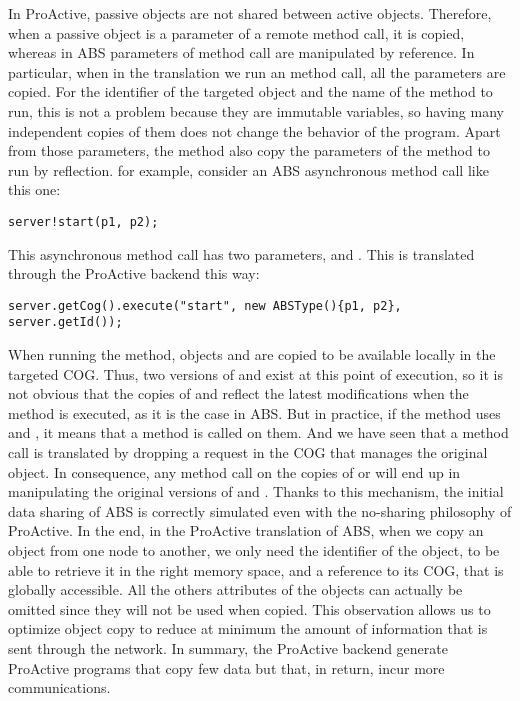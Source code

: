In ProActive, passive objects are not shared between active objects. Therefore, when a passive object is a parameter of a remote method call, it is copied, whereas in ABS parameters of method call are manipulated by reference.
In particular, when in the translation we run an  method call, all the parameters are copied. For the identifier of the targeted object and the name of the method to run, this is not a problem because they are immutable variables, so having many independent copies of them does not change the behavior of the program. Apart from those parameters, the  method also copy the parameters of the method to run by reflection.
for example, consider an ABS asynchronous method call like this one:
\begin{lstlisting}
server!start(p1, p2);
\end{lstlisting}
This asynchronous method call has two parameters,  and . 
This is translated through the ProActive backend this way:
\begin{lstlisting}
server.getCog().execute("start", new ABSType(){p1, p2}, server.getId());
\end{lstlisting}
When running the  method, objects  and  are copied to be available locally in the targeted COG. Thus, two versions of  and  exist at this point of execution, so it is not obvious that the copies of  and  reflect the latest modifications when the  method is executed, as it is the case in ABS. But in practice, if the  method uses  and , it means that a method is called on them. And we have seen that a method call is translated by dropping a request in the COG that manages the original object. In consequence, any method call on the copies of  or  will end up in manipulating the original versions of  and . Thanks to this mechanism, the initial data sharing of ABS is correctly simulated even with the no-sharing philosophy of ProActive.
In the end, in the ProActive translation of ABS, when we copy an object from one node to another, we only need the identifier of the object, to be able to retrieve it in the right memory space, and a reference to its COG, that is globally accessible. All the others attributes of the objects can actually be omitted since they will not be used when copied. This observation allows us to optimize object copy to reduce at minimum the amount of information that is sent through the network. In summary, the ProActive backend generate ProActive programs that copy few data but that, in return, incur more communications.

